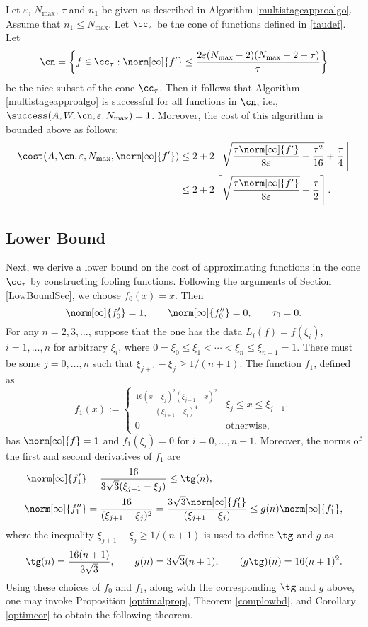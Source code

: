 \begin{theorem}   Let  $\varepsilon$, $N_{\max}$, $\tau$ and $n_1$ be given as described in Algorithm \ref{multistageapproalgo}.  Assume that $n_1 \le N_{\max}$.  Let $\cc_\tau$ be the cone of functions defined in \eqref{taudef}.  Let
$$
\cn
= \left \{ f \in \cc_\tau : \norm[\infty]{f'} \le \frac{2\varepsilon (N_{\max}-2)(N_{\max}-2 -\tau)}{\tau} \right\}
$$
be the nice subset of the cone $\cc_\tau$.  Then it follows that Algorithm \ref{multistageapproalgo} is successful for all functions in $\cn$,  i.e.,  $\success(A,W,\cn,\varepsilon,N_{\max}) = 1$.  Moreover, the cost of this algorithm is bounded above as follows:
\begin{align*}
\cost(A,\cn,\varepsilon,N_{\max},\norm[\infty]{f'})
&\le 2+2 \left \lceil \sqrt{\frac{\tau \norm[\infty]{f'}}{8\varepsilon} + \frac{\tau^2 }{16}} + \frac{\tau}{4} \right\rceil \\
&\le 2+2 \left \lceil\sqrt{\frac{\tau \norm[\infty]{f'}}{8\varepsilon}} + \frac{\tau}{2} \right \rceil.
\end{align*}
\end{theorem}


\subsection{Lower Bound}
Next, we derive a lower bound on the cost of approximating functions in the cone $\cc_{\tau}$ by constructing fooling functions. Following the arguments of Section \ref{LowBoundSec}, we choose  $f_0(x)=x.$ Then
\[
\norm[\infty]{f'_0}=1, \qquad \norm[\infty]{f''_0}=0, \qquad \tau_0=0.
\]
For any $n =2, 3, \ldots$, suppose that the one has the data $L_i(f)=f(\xi_i)$, $i=1, \ldots, n$ for arbitrary $\xi_i$, where $0=\xi_0 \le \xi_1 < \cdots < \xi_n \le \xi_{n+1} = 1$.  There must be some $j=0, \ldots, n$ such that $\xi_{j+1} - \xi_j \ge 1/(n+1)$.  The function $f_{1}$, defined as
$$
f_{1}(x):=\begin{cases} \displaystyle
\frac{16(x-\xi_{j})^{2}(\xi_{j+1}-x)^{2}}{(\xi_{i+1}-\xi_{i})^4} & \xi_{j} \le x \leq \xi_{j+1},\\
0 & \text{otherwise},
\end{cases}
$$
has $\norm[\infty]{f}=1$ and $f_1(\xi_i)=0$ for $i=0, \ldots, n+1$.  Moreover, the norms of the first and second derivatives of $f_1$ are
\begin{align*}
\norm[\infty]{f'_1}&=\frac{16}{3\sqrt{3}(\xi_{j+1}-\xi_{j})}\leq \tg(n),\\
\norm[\infty]{f''_1}&=\frac{16}{(\xi_{j+1}-\xi_{j})^2}
=\frac{3\sqrt{3}\norm[\infty]{f'_1}}{(\xi_{j+1}-\xi_{j})}
 \leq g(n) \norm[\infty]{f'_1},
\end{align*}
where the inequality $\xi_{j+1} - \xi_j \ge 1/(n+1)$ is used to define $\tg$ and $g$ as
\[
\tg(n) = \frac{16(n+1)}{3\sqrt{3}}, \qquad g(n) = 3\sqrt{3}(n+1), \qquad (g\tg)(n) = 16(n+1)^2.
\]
Using these choices of $f_0$ and $f_1$, along with the corresponding $\tg$ and $g$ above, one may invoke Proposition \ref{optimalprop}, Theorem \ref{complowbd}, and Corollary \ref{optimcor} to obtain the following theorem.

